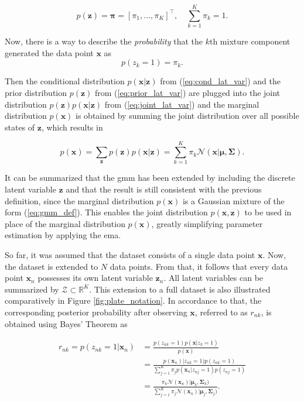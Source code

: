 \documentclass[../../../main.tex]{subfiles}
\begin{document}
\begin{equation}\label{eq:prior_lat_var}
    p(\bm{z})=\bm{\pi}=[\pi_{1}, \dots, \pi_{K}]^\top, \quad \sum\limits_{k=1}^K\pi_{k}=1.
\end{equation}

Now, there is a way to describe the \textit{probability} that the $k$th mixture component generated the data point $\bm{x}$ as
\begin{equation}
    p(z_k=1)=\pi_k.
\end{equation}



Then the conditional distribution $p(\bm{x}|\bm{z})$ from (\ref{eq:cond_lat_var}) and the prior distribution $p(\bm{z})$ from (\ref{eq:prior_lat_var}) are plugged into the joint distribution $p(\bm{z})p(\bm{x}|\bm{z})$ from (\ref{eq:joint_lat_var}) and the marginal distribution $p(\bm{x})$ is obtained by summing the joint distribution over all possible states of $\bm{z}$, which results in 

\begin{equation}\label{eq:joint_marg_lat_var}
    p(\bm{x}) = \sum\limits_{\bm{z}}p(\bm{z})p(\bm{x}|\bm{z}) = \sum\limits_{k=1}^K\pi_k\mathcal{N}(\bm{x} | \bm{\mu}, \bm{\Sigma}).
\end{equation}

It can be summarized that the \gls{gmm} has been extended by including the discrete latent variable  $\bm{z}$ and that the result is still consistent with the previous definition, since the marginal distribution $p(\bm{x})$ is a Gaussian mixture of the form (\ref{eq:gmm_def}). This enables the joint distribution $p(\bm{x}, \bm{z})$ to be used in place of the marginal distribution $p(\bm{x})$, greatly simplifying parameter estimation by applying the \gls{ema}.

So far, it was assumed that the dataset consists of a single data point $\bm{x}$. Now, the dataset is extended to $N$ data points. From that, it follows that every data point $\bm{x}_n$ possesses its own latent variable $\bm{z}_n$. All latent variables can be summarized by $\mathcal{Z} \subset \mathbb{R}^K$. This extension to a full dataset is also illustrated comparatively in Figure \ref{fig:plate_notation}. In accordance to that, the corresponding posterior probability after observing $\bm{x}$, referred to as $r_{nk}$, is obtained using Bayes' Theorem as

\begin{equation}\label{eq:responsibilities}
    \begin{aligned}
        r_{nk}=p(z_{nk}=1|\bm{x}_n) &= \frac{p(z_{nk}=1)p(\bm{x} | z_k=1)}{p(\bm{x})}\\[5pt]
        &= \frac{p(\bm{x}_n) | z_{nk}=1)p(z_{nk}=1)}{\sum_{j=1}^K\pi_j p(\bm{x}_n | z_{nj}=1)p(z_{nj}=1)} \\[5pt]
        &= \frac{\pi_k\mathcal{N}(\bm{x}_n) | \bm{\mu}_k, \bm{\Sigma}_k)}{\sum_{j=1}^K\pi_j\mathcal{N}(\bm{x}_n) | \bm{\mu}_j, \bm{\Sigma}_j)}.
    \end{aligned}
\end{equation}
\end{document}
